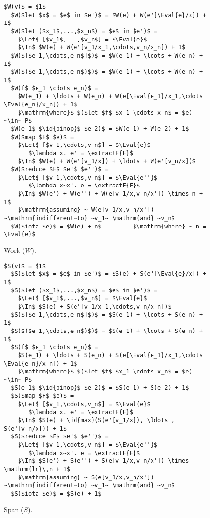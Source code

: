 \documentclass[oneside,11pt]{book}
\begin{document}
\begin{figure}
\begin{lstlisting}[mathescape=true,style=nonumbers]
  $W(v)$ = $1$
  $W($let $x$ = $e$ in $e')$ = $W(e) + W(e'[\Eval{e}/x]) + 1$
  $W($let ($x_1$,...,$x_n$) = $e$ in $e')$ =
    $\Let$ [$v_1$,...,$v_n$] = $\Eval{e}$
    $\In$ $W(e) + W(e'[v_1/x_1,\cdots,v_n/x_n]) + 1$
  $W($[$e_1,\cdots,e_n$]$)$ = $W(e_1) + \ldots + W(e_n) + 1$
  $W($($e_1,\cdots,e_n$)$)$ = $W(e_1) + \ldots + W(e_n) + 1$
  $W(f$ $e_1 \cdots e_n)$ =
    $W(e_1) + \ldots + W(e_n) + W(e[\Eval{e_1}/x_1,\cdots \Eval{e_n}/x_n]) + 1$
    $\mathrm{where}$ $($let $f$ $x_1 \cdots x_n$ = $e) ~\in~ P$
  $W(e_1$ $\id{binop}$ $e_2)$ = $W(e_1) + W(e_2) + 1$
  $W($map $F$ $e)$ =
    $\Let$ [$v_1,\cdots,v_n$] = $\Eval{e}$
       $\lambda x. e' = \extractF{F}$
    $\In$ $W(e) + W(e'[v_1/x]) + \ldots + W(e'[v_n/x])$
  $W($reduce $F$ $e'$ $e'')$ =
    $\Let$ [$v_1,\cdots,v_n$] = $\Eval{e''}$
       $\lambda x~x'. e = \extractF{F}$
    $\In$ $W(e') + W(e'') + W(e[v_1/x,v_n/x']) \times n + 1$
    $\mathrm{assuming} ~ W(e[v_1/x,v_n/x']) ~\mathrm{indifferent~to} ~v_1~ \mathrm{and} ~v_n$
  $W($iota $e)$ = $W(e) + n$         $\mathrm{where} ~ n = \Eval{e}$
\end{lstlisting}

\caption{Work ($W$).}
\label{fig:work}
\end{figure}

\begin{figure}
\begin{lstlisting}[mathescape=true,style=nonumbers]
  $S(v)$ = $1$
  $S($let $x$ = $e$ in $e')$ = $S(e) + S(e'[\Eval{e}/x]) + 1$
  $S($let ($x_1$,...,$x_n$) = $e$ in $e')$ =
    $\Let$ [$v_1$,...,$v_n$] = $\Eval{e}$
    $\In$ $S(e) + S(e'[v_1/x_1,\cdots,v_n/x_n])$
  $S($[$e_1,\cdots,e_n$]$)$ = $S(e_1) + \ldots + S(e_n) + 1$
  $S($($e_1,\cdots,e_n$)$)$ = $S(e_1) + \ldots + S(e_n) + 1$
  $S(f$ $e_1 \cdots e_n)$ =
    $S(e_1) + \ldots + S(e_n) + S(e[\Eval{e_1}/x_1,\cdots \Eval{e_n}/x_n]) + 1$
    $\mathrm{where}$ $($let $f$ $x_1 \cdots x_n$ = $e) ~\in~ P$
  $S(e_1$ $\id{binop}$ $e_2)$ = $S(e_1) + S(e_2) + 1$
  $S($map $F$ $e)$ =
    $\Let$ [$v_1,\cdots,v_n$] = $\Eval{e}$
       $\lambda x. e' = \extractF{F}$
    $\In$ $S(e) + \id{max}(S(e'[v_1/x]), \ldots , S(e'[v_n/x])) + 1$
  $S($reduce $F$ $e'$ $e'')$ =
    $\Let$ [$v_1,\cdots,v_n$] = $\Eval{e''}$
       $\lambda x~x'. e = \extractF{F}$
    $\In$ $S(e') + S(e'') + S(e[v_1/x,v_n/x']) \times \mathrm{ln}\,n + 1$
    $\mathrm{assuming} ~ S(e[v_1/x,v_n/x']) ~\mathrm{indifferent~to} ~v_1~ \mathrm{and} ~v_n$
  $S($iota $e)$ = $S(e) + 1$
\end{lstlisting}

\caption{Span ($S$).}
\label{fig:span}
\end{figure}
\end{document}
